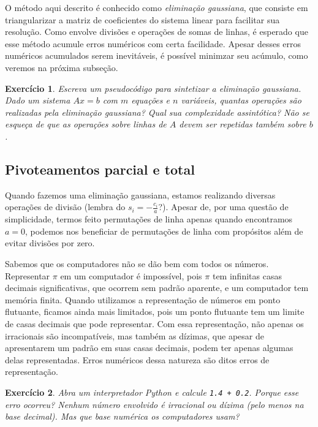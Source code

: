 \documentclass[]{article}
\newtheorem{exercicio}{Exercício}
\numberwithin{equation}{section}
\begin{document}
O método aqui descrito é conhecido como \emph{eliminação gaussiana}, que consiste em triangularizar a matriz de coeficientes do sistema linear para facilitar sua resolução. Como envolve divisões e operações de somas de linhas, é esperado que esse método acumule erros numéricos com certa facilidade. Apesar desses erros numéricos acumulados serem inevitáveis, é possível minimzar seu acúmulo, como veremos na próxima subseção.

\begin{exercicio}
	Escreva um pseudocódigo para sintetizar a eliminação gaussiana. Dado um sistema $Ax = b$ com $m$ equações e $n$ variáveis, quantas operações são realizadas pela eliminação gaussiana? Qual sua complexidade assintótica? Não se esqueça de que as operações sobre linhas de $A$ devem ser repetidas também sobre $b$.
\end{exercicio}

\subsection{Pivoteamentos parcial e total}

Quando fazemos uma eliminação gaussiana, estamos realizando diversas operações de divisão (lembra do $s_i = -\frac{c_i}{a}$?). Apesar de, por uma questão de simplicidade, termos feito permutações de linha apenas quando encontramos $a = 0$, podemos nos beneficiar de permutações de linha com propósitos além de evitar divisões por zero.

Sabemos que os computadores não se dão bem com todos os números. Representar $\pi$ em um computador é impossível, pois $\pi$ tem infinitas casas decimais significativas, que ocorrem sem padrão aparente, e um computador tem memória finita. Quando utilizamos a representação de números em ponto flutuante, ficamos ainda mais limitados, pois um ponto flutuante tem um limite de casas decimais que pode representar. Com essa representação, não apenas os irracionais são incompatíveis, mas também as dízimas, que apesar de apresentarem um padrão em suas casas decimais, podem ter apenas algumas delas representadas. Erros numéricos dessa natureza são ditos erros de representação.

\begin{exercicio}
	Abra um interpretador Python e calcule \texttt{1.4 + 0.2}. Porque esse erro ocorreu? Nenhum número envolvido é irracional ou dízima (pelo menos na base decimal). Mas que base numérica os computadores usam?
\end{exercicio}
\end{document}
